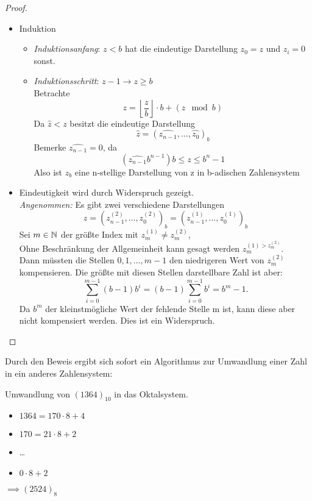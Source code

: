 \begin{proof}

\begin{itemize}
\item Induktion \medskip
\begin{itemize}[label=$\lozenge$, itemsep=2ex]
\item \emph{Induktionsanfang}: \underline{$z<b$} hat die eindeutige Darstellung $z_0=z$ und $z_i=0$ sonst.



\item \emph{Induktionsschritt}: \underline{$z-1 \to z\ge b$} \\   

Betrachte
\[
z= \left\lfloor{\frac{z}{b}}\right\rfloor \cdot b + (z \mod b)
\]
Da $\hat{z}<z$ besitzt die eindeutige Darstellung
\[
\hat{z}= (\hat{z_{n-1}},\ldots, \hat{z_0})_b
\]
Bemerke $\hat{z_{n-1}}=0$, da 
\[
\left( \hat{z_{n-1}}b^{n-1} \right)b \le z \le b^{n}-1
\]
Also ist $z_b$ eine n-stellige Darstellung von z in b-adischen Zahlensystem

\end{itemize}

\item Eindeutigkeit wird durch Widerspruch gezeigt. \\
\emph{Angenommen:} Es gibt zwei verschiedene Darstellungen
\[
z=\left( z_{n-1}^{(2)},\ldots, z_0^{(2)} \right)_b = \left(z_{n-1}^{(1)},\ldots,z_0^{(1)} \right)_b
\]
Sei $m \in  \mathbb{N}$ der größte Index mit $z_m^{(1)} \neq z_m^{(2)}$, \\
Ohne Beschränkung der Allgemeinheit kann gesagt werden $z_m^{(1)>z_m^{(2)}}$. \\
Dann müssten die Stellen $0,1,\ldots,m-1$ den niedrigeren Wert von $z_m^{(2)}$ kompensieren. Die größte mit diesen Stellen darstellbare Zahl ist aber:
\[
\sum_{i=0}^{m-1}(b-1)b^{i}= (b-1)\sum_{i=0}^{m-1}b^{i}= b^{m}-1 \text{.}
\]
Da $b^{m}$ der kleinstmögliche Wert der fehlende Stelle m ist, kann diese aber nicht kompensiert werden. Dies ist ein Widerspruch.
\end{itemize}
\end{proof}%
Durch den Beweis ergibt sich sofort ein Algorithmus zur Umwandlung einer Zahl in ein anderes Zahlensystem:
\begin{example}
Umwandlung von $(1364)_{10}$ in das Oktalsystem.
\begin{itemize}
	\item $1364 = 170 \cdot 8 +4$
	\item $170 = 21 \cdot 8 +2$
	\item \ldots
	\item $0 \cdot 8 + 2$
\end{itemize}
$\implies (2524)_8$
\end{example}

